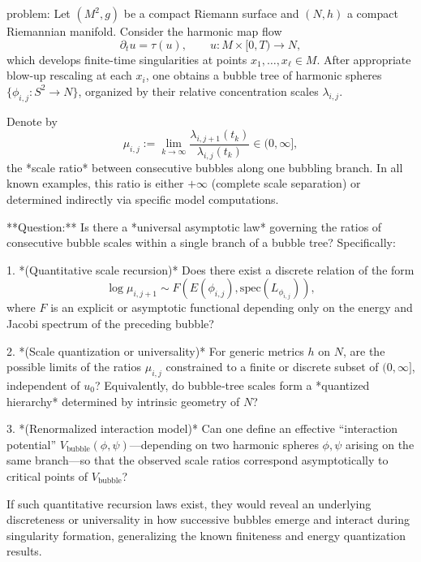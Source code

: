 problem:  
Let \( (M^2,g) \) be a compact Riemann surface and \( (N,h) \) a compact Riemannian manifold. Consider the harmonic map flow  
\[
\partial_t u = \tau(u), \qquad u: M\times[0,T)\to N,
\]
which develops finite-time singularities at points \(x_1,\dots,x_\ell\in M\). After appropriate blow-up rescaling at each \(x_i\), one obtains a bubble tree of harmonic spheres  
\(\{\phi_{i,j}:S^2\to N\}\), organized by their relative concentration scales \(\lambda_{i,j}\).

Denote by  
\[
\mu_{i,j} := \lim_{k\to\infty} \frac{\lambda_{i,j+1}(t_k)}{\lambda_{i,j}(t_k)} \in (0,\infty],
\]
the *scale ratio* between consecutive bubbles along one bubbling branch. In all known examples, this ratio is either \(+\infty\) (complete scale separation) or determined indirectly via specific model computations.

**Question:**  
Is there a *universal asymptotic law* governing the ratios of consecutive bubble scales within a single branch of a bubble tree? Specifically:

1. *(Quantitative scale recursion)*  Does there exist a discrete relation of the form  
   \[
   \log \mu_{i,j+1} \sim F(E(\phi_{i,j}), \mathrm{spec}(L_{\phi_{i,j}})),
   \]
   where \(F\) is an explicit or asymptotic functional depending only on the energy and Jacobi spectrum of the preceding bubble?  

2. *(Scale quantization or universality)*  For generic metrics \(h\) on \(N\), are the possible limits of the ratios \(\mu_{i,j}\) constrained to a finite or discrete subset of \((0,\infty]\), independent of \(u_0\)?  Equivalently, do bubble‐tree scales form a *quantized hierarchy* determined by intrinsic geometry of \(N\)?  

3. *(Renormalized interaction model)*  Can one define an effective “interaction potential” \(V_{\text{bubble}}(\phi,\psi)\)—depending on two harmonic spheres \(\phi,\psi\) arising on the same branch—so that the observed scale ratios correspond asymptotically to critical points of \(V_{\text{bubble}}\)?  

If such quantitative recursion laws exist, they would reveal an underlying discreteness or universality in how successive bubbles emerge and interact during singularity formation, generalizing the known finiteness and energy quantization results.

